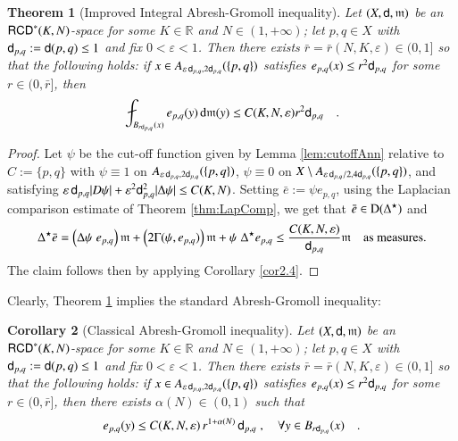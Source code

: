 \documentclass[11pt,reqno]{amsart}
\newcommand{\dom}{\rm D}
\newcommand{\mm}{\mathfrak m}
\newcommand{\sfd}{{\sf d}}
\renewcommand{\d}{{\rm{d}}}
\newcommand{\R}{\mathbb{R}}
\newcommand{\RCD}{{\sf RCD}}
\newtheorem{theorem}{Theorem}[section]
\newtheorem{corollary}[theorem]{Corollary}
\theoremstyle{definition}
\theoremstyle{remark}
\theoremstyle{remark}
\theoremstyle{remark}
\theoremstyle{remark}
\theoremstyle{remark}
\theoremstyle{remark}
\theoremstyle{remark}
\begin{document}
\begin{theorem}[Improved Integral Abresh-Gromoll inequality]\label{thm:ImprAbrGrom} 
Let $(X,\sfd,\mm)$ be an  $\RCD^*(K,N)$-space for some $K \in \R$ and $N \in (1,+\infty)$; let $p,q \in X$ with $\sfd_{p,q}:=\sfd(p,q)\leq 1$ and  fix $0<\varepsilon<1$. 
Then there exists  $\bar{r}=\bar{r}(N,K,\varepsilon)\in (0,1]$ so that the following holds: if $x \in A_{\varepsilon \, \sfd_{p,q}, 2 \sfd_{p,q}}(\{p,q\})$ satisfies $e_{p,q}(x)\leq r^2 \sfd_{p,q}$ for some $r \in (0,\bar{r}]$, then
$$\fint_{B_{r \sfd_{p,q}}(x)} e_{p,q}(y) \, \d \mm(y) \leq C(K,N,\varepsilon) r^2 \sfd_{p,q} \quad.$$
\end{theorem}  

\begin{proof}
Let $\psi$ be the cut-off function given by Lemma \ref{lem:cutoffAnn} relative to $C:=\{p,q\}$ with  $\psi\equiv 1$ on $A_{\varepsilon \, \sfd_{p,q}, 2 \sfd_{p,q}}(\{p,q\})$, $\psi\equiv 0$ on  $X\setminus A_{\varepsilon \, \sfd_{p,q}/2 , 4 \sfd_{p,q}}(\{p,q\})$, and satisfying $ \varepsilon \, \sfd_{p,q} |D \psi|+  \varepsilon^2 \sfd_{p,q}^2|\Delta \psi| \leq C(K,N)$. Setting $\bar{e}:= \psi e_{p,q}$, using the Laplacian comparison estimate of Theorem \ref{thm:LapComp}, we get that $\bar{e}\in \dom(\Delta^\star)$ and
$$\Delta^\star \bar{e}= \left(\Delta \psi\; e_{p,q} \right) \mm+ \left( 2 \Gamma(\psi,e_{p,q}) \right) \mm + \psi \; \Delta^\star e_{p,q} \leq \frac{C(K,N,\varepsilon)}{\sfd_{p,q}} \mm \quad\text{as measures}.$$
The claim follows then by applying Corollary \ref{cor2.4}.
\end{proof}
\noindent
Clearly, Theorem \ref{thm:ImprAbrGrom} implies the standard Abresh-Gromoll inequality:

\begin{corollary}[Classical Abresh-Gromoll inequality]\label{cor:AbrGrom}
Let $(X,\sfd,\mm)$ be an  $\RCD^*(K,N)$-space for some $K \in \R$ and $N \in (1,+\infty)$; let $p,q \in X$ with $\sfd_{p,q}:=\sfd(p,q)\leq 1$ and  fix $0<\varepsilon<1$.
Then there exists  $\bar{r}=\bar{r}(N,K,\varepsilon)\in (0,1]$ so that the following holds: if $x \in A_{\varepsilon \, \sfd_{p,q}, 2 \sfd_{p,q}}(\{p,q\})$ satisfies $e_{p,q}(x)\leq r^2 \sfd_{p,q}$ for some  $r \in (0,\bar{r}]$, then there exists $\alpha(N)\in (0,1)$ such that
$$ e_{p,q}(y)\leq  C(K,N,\varepsilon)\,  r^{1+\alpha(N)} \, \sfd_{p,q}\; , \quad \forall y \in B_{r \sfd_{p,q}}(x)\quad .$$
\end{corollary}
\end{document}
